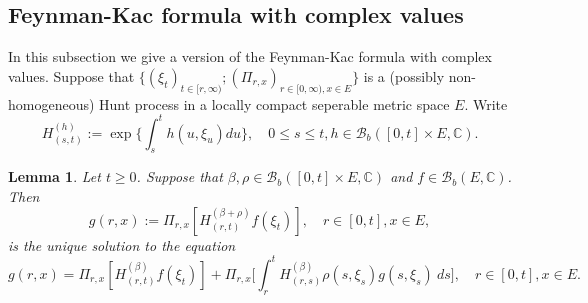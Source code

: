 \documentclass[12pt]{amsart}
\theoremstyle{plain}
\newtheorem{lem}[thm]{Lemma}
\theoremstyle{definition}
\numberwithin{equation}{section}
\begin{document}
\subsection{Feynman-Kac formula with complex values}
\label{seq: complex Feynman-Kac transform}
    In this subsection we give a version of the Feynman-Kac formula with complex values.
    Suppose that $\{(\xi_t)_{t \in [r,\infty)}; (\Pi_{r,x})_{r\in [0,\infty), x\in E}\}$ is a (possibly non-homogeneous) Hunt process in a locally compact seperable metric space $E$.
    Write
\begin{equation}
    H^{(h)}_{(s,t)}
    := \exp\Big\{\int_s^t h(u,\xi_u) du\Big\},
    \quad 0 \leq s \leq t, h \in \mathcal B_b([0,t] \times E,\mathbb C).
\end{equation}
\begin{lem}
    Let $t \geq 0$. Suppose that $\beta,\rho\in \mathcal B_b([0,t] \times E, \mathbb C)$ and $f\in \mathcal B_b(E, \mathbb C)$.
    Then 
\begin{equation}
    g(r,x) := \Pi_{r,x}[ H_{(r,t)}^{(\beta+\rho)} f(\xi_t)],\quad r \in [0,t], x\in E,
\end{equation}
    is the unique solution to the equation
\[
    g(r,x)= \Pi_{r,x} [ H_{(r,t)}^{(\beta)} f(\xi_t)]+\Pi_{r,x} \Big[ \int_r^tH_{(r,s)}^{(\beta)}\rho(s,\xi_s) g(s,\xi_s)~ds \Big],\quad r \in [0,t], x\in E.
\]
\end{lem}
\end{document}
